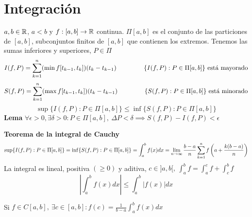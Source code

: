 \section{Integración}
$a,b\in\mathbb{R}$, $a<b$ y $f:[a,b]\rightarrow\mathbb{R}$ continua. 
$\Pi[a,b]$ es el conjunto de las particiones de $[a,b]$, subconjuntos finitos de $[a,b]$ que contienen los extremos. 
Tenemos las sumas inferiores y superiores, $P\in\Pi$
$$ I(f,P) = \sum_{k=1}^{n} (\min f[t_{k-1}, t_k])(t_k-t_{k-1}) \hspace{1.5cm}\{ I(f,P):P\in\Pi[a,b]\} \text{ está mayorado}$$
$$ S(f,P) = \sum_{k=1}^{n} (\max f[t_{k-1}, t_k])(t_k-t_{k-1}) \hspace{1.5cm}\{ S(f,P):P\in\Pi[a,b]\} \text{ está minorado}$$
$$ \sup \{ I(f,P):P\in\Pi[a,b]\} \leq \inf \{ S(f,P):P\in\Pi[a,b]\}  $$
\textbf{Lema} $\forall\epsilon>0, \exists\delta>0 : P\in\Pi[a,b], \ \Delta P<\delta \implies S(f,P)-I(f,P)<\epsilon$

\textbf{Teorema de la integral de Cauchy}
$$ \sup \{ I(f,P):P\in\Pi[a,b]\} = \inf \{ S(f,P):P\in\Pi[a,b]\} = \int_{a}^{b} f(x)dx = \lim_{\substack{n\rightarrow\infty}} \frac{b-a}{n}\sum_{k=1}^{n}f\left(a+\frac{k(b-a)}{n}\right)$$
La integral es lineal, positiva $(\geq0)$ y aditiva, $c\in]a,b[, \ \int_a^b f= \int_a^c f + \int_c^b f$
$$\left|\int_{a}^{b} f(x)dx\right| \leq \int_{a}^{b} |f(x)|dx$$

Si $f\in C[a,b], \ \exists c\in[a,b] : f(c) = \frac{1}{b-a} \int_a^b f(x)dx$